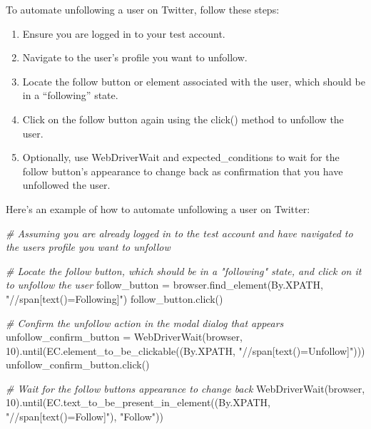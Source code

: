 \documentclass[
  paper=a4,
  ,captions=tableheading
]{scrartcl}
\newenvironment{Shaded}{}{}
\newcommand{\CommentTok}[1]{\textcolor[rgb]{0.38,0.63,0.69}{\textit{#1}}}
\newcommand{\DecValTok}[1]{\textcolor[rgb]{0.25,0.63,0.44}{#1}}
\newcommand{\NormalTok}[1]{#1}
\newcommand{\OperatorTok}[1]{\textcolor[rgb]{0.40,0.40,0.40}{#1}}
\newcommand{\StringTok}[1]{\textcolor[rgb]{0.25,0.44,0.63}{#1}}
\providecommand{\tightlist}{%
  \setlength{\itemsep}{0pt}\setlength{\parskip}{0pt}}
\begin{document}
To automate unfollowing a user on Twitter, follow these steps:

\begin{enumerate}
\def\labelenumi{\arabic{enumi}.}
\tightlist
\item
  Ensure you are logged in to your test account.
\item
  Navigate to the user's profile you want to unfollow.
\item
  Locate the follow button or element associated with the user, which
  should be in a ``following'' state.
\item
  Click on the follow button again using the click() method to unfollow
  the user.
\item
  Optionally, use WebDriverWait and expected\_conditions to wait for the
  follow button's appearance to change back as confirmation that you
  have unfollowed the user.
\end{enumerate}

Here's an example of how to automate unfollowing a user on Twitter:

\begin{Shaded}
\begin{Highlighting}[]

\CommentTok{\# Assuming you are already logged in to the test account and have navigated to the user\textquotesingle{}s profile you want to unfollow}

\CommentTok{\# Locate the follow button, which should be in a "following" state, and click on it to unfollow the user}
\NormalTok{follow\_button }\OperatorTok{=}\NormalTok{ browser.find\_element(By.XPATH, }\StringTok{"//span[text()=\textquotesingle{}Following\textquotesingle{}]"}\NormalTok{)}
\NormalTok{follow\_button.click()}

\CommentTok{\# Confirm the unfollow action in the modal dialog that appears}
\NormalTok{unfollow\_confirm\_button }\OperatorTok{=}\NormalTok{ WebDriverWait(browser, }\DecValTok{10}\NormalTok{).until(EC.element\_to\_be\_clickable((By.XPATH, }\StringTok{"//span[text()=\textquotesingle{}Unfollow\textquotesingle{}]"}\NormalTok{)))}
\NormalTok{unfollow\_confirm\_button.click()}

\CommentTok{\# Wait for the follow button\textquotesingle{}s appearance to change back}
\NormalTok{WebDriverWait(browser, }\DecValTok{10}\NormalTok{).until(EC.text\_to\_be\_present\_in\_element((By.XPATH, }\StringTok{"//span[text()=\textquotesingle{}Follow\textquotesingle{}]"}\NormalTok{), }\StringTok{"Follow"}\NormalTok{))}
\end{Highlighting}
\end{Shaded}
\end{document}
